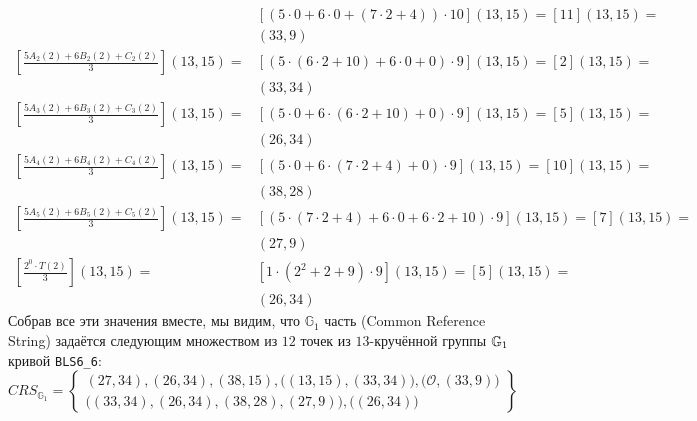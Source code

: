 \begin{example}
\begin{align*}
 & [(5\cdot 0 +6\cdot 0 + (7\cdot 2 + 4))\cdot 10](13,15) = [11](13,15) = \\
 & (33,9) \\
[\frac{5 A_{2}(2)+ 6 B_{2}(2) + C_{2}(2)}{3}](13,15) =
 & [(5\cdot (6\cdot 2 +10) +6\cdot 0 +0 )\cdot 9](13,15) = [2](13,15) = \\
 & (33,34) \\
[\frac{5 A_{3}(2)+ 6 B_{3}(2) + C_{3}(2)}{3}](13,15) =
 & [(5\cdot 0 +6\cdot (6\cdot 2 + 10) + 0 )\cdot 9](13,15) = [5](13,15) = \\
 & (26,34) \\
[\frac{5 A_{4}(2)+ 6 B_{4}(2) + C_{4}(2)}{3}](13,15) = 
 & [(5\cdot 0+6\cdot(7\cdot 2 +4)+0)\cdot 9](13,15) =[10](13,15) = \\
 & (38,28) \\
[\frac{5 A_{5}(2)+ 6 B_{5}(2) + C_{5}(2)}{3}](13,15) =
 & [(5\cdot (7\cdot 2 + 4) +6\cdot 0 + 6\cdot 2 + 10 )\cdot 9](13,15) = [7](13,15) = \\
 & (27,9)\\
[\frac{2^0\cdot T(2)}{3}](13,15) =
 & [1\cdot (2^2+2+9)\cdot 9](13,15)= [5](13,15) = \\
 & (26,34)
\end{align*}
Собрав все эти значения вместе, мы видим, что $\mathbb{G}_1$ часть  (Common Reference String) задаётся следующим множеством из $12$ точек из $13$-кручённой группы $\mathbb{G}_1$ кривой \texttt{BLS6\_6}:
\begin{equation}
\label{eq:3-fac-groth-16-crs}
CRS_{\mathbb{G}_{1}}=\left\{ \begin{array}{c}
(27,34),(26,34),(38,15),\Big((13,15),(33,34)\Big),
\Big(\mathcal{O}, (33,9)\Big)\\
\Big((33,34),(26,34),(38,28),(27,9)\Big),
\Big((26,34)\Big)
\end{array}\right\}
\end{equation}


\end{example}
